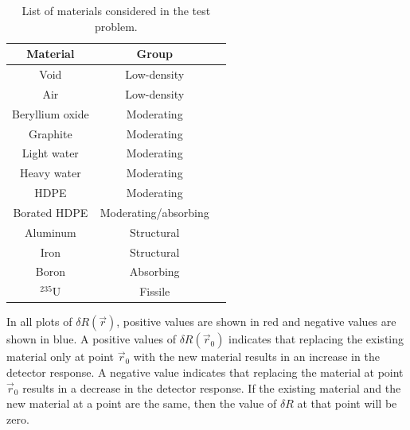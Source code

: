 \begin{table}[h]
  \centering
  \caption{List of materials considered in the test problem.}
  \label{tab:testprob:material_list}
  \begin{tabular}{| c | c | c |}
    \hline
    \textbf{Material}  & \textbf{Group}       \\ \hline
    Void               & Low-density          \\ \hline
    Air                & Low-density          \\ \hline
    Beryllium oxide    & Moderating           \\ \hline
    Graphite           & Moderating           \\ \hline
    Light water        & Moderating           \\ \hline
    Heavy water        & Moderating           \\ \hline
    HDPE               & Moderating           \\ \hline
    Borated HDPE       & Moderating/absorbing \\ \hline
    Aluminum           & Structural           \\ \hline
    Iron               & Structural           \\ \hline
    Boron              & Absorbing            \\ \hline
    ${}^{235}\text{U}$ & Fissile              \\ \hline
  \end{tabular}
\end{table}

In all plots of $\delta R\left(\vec{r}\right)$, positive values are shown in red and negative values are shown in blue.
A positive values of $\delta R\left(\vec{r}_0\right)$ indicates that replacing the existing material only at point $\vec{r}_0$ with the new material results in an increase in the detector response.
A negative value indicates that replacing the material at point $\vec{r}_0$ results in a decrease in the detector response.
If the existing material and the new material at a point are the same, then the value of $\delta R$ at that point will be zero.

